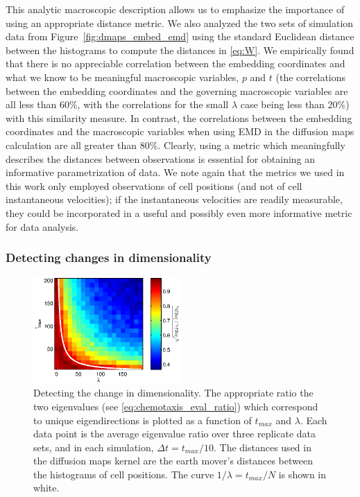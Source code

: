 \documentclass[3p]{elsarticle}
\begin{document}

This analytic macroscopic description allows us to emphasize the importance of using an appropriate distance metric.
%
We also analyzed the two sets of simulation data from Figure~\ref{fig:dmaps_embed_emd} using the standard 
Euclidean distance between the histograms to compute the distances in \eqref{eq:W}.
%
We empirically found that there is no appreciable correlation between the embedding 
coordinates and what we know to be meaningful macroscopic variables, $p$ and $t$ (the correlations between the embedding 
coordinates and the governing macroscopic variables are all less than 60\%, with the correlations for 
the small $\lambda$ case being less than 20\%) with this similarity measure.
%
In contrast, the correlations between the embedding coordinates and the macroscopic variables when using EMD in the diffusion maps 
calculation are all greater than 80\%.
%
Clearly, using a metric which meaningfully describes the distances between observations 
is essential for obtaining an informative parametrization of data.
%
We note again that the metrics we used in this work only employed observations of cell positions (and not of cell instantaneous
velocities); if the instantaneous velocities are readily measurable, they could be incorporated in a useful
and possibly even more informative metric for data analysis.

\subsubsection{Detecting changes in dimensionality}

\begin{figure}[t]
%
\centering
\includegraphics[width=0.5\textwidth]{tmax_lambda_transition}
%
\caption{Detecting the change in dimensionality. The appropriate ratio the two eigenvalues (see \eqref{eq:chemotaxis_eval_ratio}) which correspond to unique eigendirections is plotted as a function of $t_{max}$ and $\lambda$. Each data point is the average eigenvalue ratio over three replicate data sets, and in each simulation, $\Delta t=t_{max}/10$. The distances used in the diffusion maps kernel are the earth mover's distances between the histograms of cell positions. The curve $1/\lambda = t_{max}/N$ is shown in white. }
%
\label{fig:chemotaxis_compare_timescales_evals}
%
\end{figure}
\end{document}
